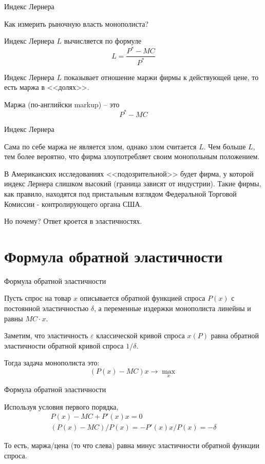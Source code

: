 \documentclass{beamer}
\begin{document}
\begin{frame}{Индекс Лернера}

Как измерить рыночную власть монополиста?

\begin{definition}
\alert{Индекс Лернера} $L$ вычисляется по формуле
$$L = \frac{P^{\ast}-MC}{P^{\ast}}$$
\end{definition}
Индекс Лернера $L$ показывает отношение маржи фирмы к действующей цене, то есть маржа в <<долях>>.

\begin{definition}
\alert{Маржа} (по-английски markup) – это 
$$P^{\ast}-MC$$
\end{definition}

\end{frame}

\begin{frame}{Индекс Лернера}

Сама по себе маржа не является злом, однако злом считается $L$. Чем больше $L$, тем более вероятно, что фирма злоупотребляет своим монопольным положением.

В Американских исследованиях <<подозрительной>> будет фирма, у которой индекс Лернера слишком высокий (граница зависят от индустрии). Такие фирмы, как правило, находятся под пристальным взглядом Федеральной Торговой Комиссии - контролирующего органа США. 

Но почему? Ответ кроется в эластичностях.

\end{frame}

\section{Формула обратной эластичности}

\begin{frame}{Формула обратной эластичности}

Пусть спрос на товар $x$ описывается \alert{обратной функцией спроса} $P(x)$ с постоянной эластичностью $\delta$, а \alert{переменные издержки} монополиста линейны и равны $MC \cdot x$. 

Заметим, что эластичность $\varepsilon$ классической кривой спроса $x(P)$ равна обратной эластичности обратной кривой спроса $1/\delta$. 

Тогда задача монополиста это:
$$ (P(x) - MC)x \to \max_x$$

\end{frame}

\begin{frame}{Формула обратной эластичности}

Используя условия первого порядка,
\begin{gather*}
P(x) - MC + P'(x)x = 0\\
(P(x) - MC)/P(x) = - P'(x)x/P(x) = - \delta
\end{gather*}

То есть, маржа/цена (то что слева) равна минус эластичности обратной функции спроса.
\end{frame}
\end{document}
